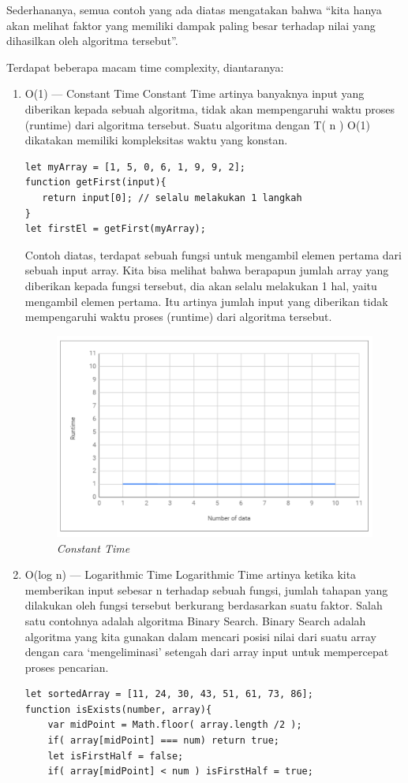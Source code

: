 Sederhananya, semua contoh yang ada diatas mengatakan bahwa “kita hanya akan melihat faktor yang memiliki dampak paling besar terhadap nilai yang dihasilkan oleh algoritma tersebut”.

Terdapat beberapa macam time complexity, diantaranya:
\begin{enumerate}
\item O(1) — Constant Time
Constant Time artinya banyaknya input yang diberikan kepada sebuah algoritma, tidak akan mempengaruhi waktu proses (runtime) dari algoritma tersebut. Suatu algoritma dengan T( n )  O(1) dikatakan memiliki kompleksitas waktu yang konstan.
\begin{lstlisting}
let myArray = [1, 5, 0, 6, 1, 9, 9, 2];
function getFirst(input){
   return input[0]; // selalu melakukan 1 langkah
}
let firstEl = getFirst(myArray);
\end{lstlisting}
Contoh diatas, terdapat sebuah fungsi untuk mengambil elemen pertama dari sebuah input array. Kita bisa melihat bahwa berapapun jumlah array yang diberikan kepada fungsi tersebut, dia akan selalu melakukan 1 hal, yaitu mengambil elemen pertama. Itu artinya jumlah input yang diberikan tidak mempengaruhi waktu proses (runtime) dari algoritma tersebut.
\begin{figure}[H]
    \centering
    \includegraphics[scale=0.5]{figures/cons_time}
    \caption{\textit{Constant Time}}
    \label{cons}
\end{figure}

\item O(log n) — Logarithmic Time
Logarithmic Time artinya ketika kita memberikan input sebesar n terhadap sebuah fungsi, jumlah tahapan yang dilakukan oleh fungsi tersebut berkurang berdasarkan suatu faktor. Salah satu contohnya adalah algoritma Binary Search.
Binary Search adalah algoritma yang kita gunakan dalam mencari posisi nilai dari suatu array dengan cara ‘mengeliminasi’ setengah dari array input untuk mempercepat proses pencarian.
\begin{lstlisting}
let sortedArray = [11, 24, 30, 43, 51, 61, 73, 86];
function isExists(number, array){
    var midPoint = Math.floor( array.length /2 );
    if( array[midPoint] === num) return true;
    let isFirstHalf = false;
    if( array[midPoint] < num ) isFirstHalf = true;
  

\end{lstlisting}
\end{enumerate}
